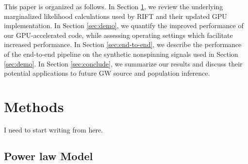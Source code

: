 \documentclass[twocolumn,prd,nofootinbib]{revtex4}
\newcommand\Y[1]{{{}_{#1}Y}}
\begin{document}
This paper is organized as follows.
In Section \ref{sec:methods}, we review the underlying marginalized likelihood calculations used by RIFT and  their updated GPU
implementation.  
In Section \ref{sec:demo}, we quantify the improved performance of our  GPU-accelerated code,   while assessing
operating settings which facilitate increased performance.
In Section \ref{sec:end-to-end}, we describe the performance of the end-to-end pipeline on the synthetic nonspinning signals used in
Section \ref{sec:demo}.  
In Section \ref{sec:conclude}, we summarize our results and discuss their potential applications to future GW source and
population inference.


\section{Methods}
\label{sec:methods}

I need to start writing from here.



\subsection{Power law Model}








\end{document}
